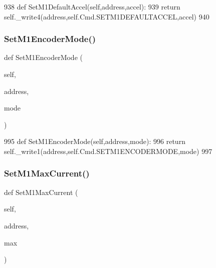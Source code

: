 \begin{DoxyCode}
938     \textcolor{keyword}{def }SetM1DefaultAccel(self,address,accel):
939         \textcolor{keywordflow}{return} self.\_write4(address,self.Cmd.SETM1DEFAULTACCEL,accel)
940 
\end{DoxyCode}
\mbox{\label{classtoxic__hardware_1_1roboclaw__3_1_1Roboclaw_ac32404cfafd3dd0c49983b724717945b}} 
\subsubsection{\texorpdfstring{Set\+M1\+Encoder\+Mode()}{SetM1EncoderMode()}}
{\footnotesize\ttfamily def Set\+M1\+Encoder\+Mode (\begin{DoxyParamCaption}\item[{}]{self,  }\item[{}]{address,  }\item[{}]{mode }\end{DoxyParamCaption})}


\begin{DoxyCode}
995     \textcolor{keyword}{def }SetM1EncoderMode(self,address,mode):
996         \textcolor{keywordflow}{return} self.\_write1(address,self.Cmd.SETM1ENCODERMODE,mode)
997 
\end{DoxyCode}
\mbox{\label{classtoxic__hardware_1_1roboclaw__3_1_1Roboclaw_a753f6a7ecb157eb9cdaf3a6f4b83fb93}} 
\subsubsection{\texorpdfstring{Set\+M1\+Max\+Current()}{SetM1MaxCurrent()}}
{\footnotesize\ttfamily def Set\+M1\+Max\+Current (\begin{DoxyParamCaption}\item[{}]{self,  }\item[{}]{address,  }\item[{}]{max }\end{DoxyParamCaption})}


